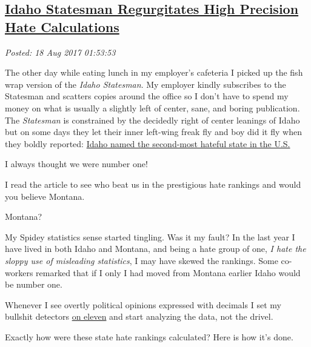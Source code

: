 %

\subsection*{\href{http://analyzethedatanotthedrivel.org/2017/08/17/idaho-statesman-regurgitates-high-precision-hate-calculations/}{Idaho Statesman Regurgitates High Precision Hate Calculations}}


\noindent\emph{Posted: 18 Aug 2017 01:53:53}
\vspace{6pt}


The other day while eating lunch in my employer's cafeteria I picked up
the fish wrap version of the \emph{Idaho Statesman}. My employer kindly
subscribes to the Statesman and scatters copies around the office so I
don't have to spend my money on what is usually a slightly left of
center, sane, and boring publication. The \textit{Statesman} is constrained by
the decidedly right of center leanings of Idaho but on some days they
let their inner left-wing freak fly and boy did it fly when they boldly
reported:
\href{http://www.idahostatesman.com/news/state/idaho/article167378712.html}{Idaho
named the second-most hateful state in the U.S.}

I always thought we were number one!

I read the article to see who beat us in the prestigious hate rankings
and would you believe Montana.

Montana?

My Spidey statistics sense started tingling. Was it my fault? In the
last year I have lived in both Idaho and Montana, and being a hate group
of one, \emph{I hate the sloppy use of misleading statistics}, I may
have skewed the rankings. Some co-workers remarked that if I only I had
moved from Montana earlier Idaho would be number one.

Whenever I see overtly political opinions expressed with decimals I set
my bullshit detectors
\href{https://www.youtube.com/watch?v=4xgx4k83zzc}{on eleven} and start
analyzing the data, not the drivel.

Exactly how were these state hate rankings calculated? Here is how it's
done.

